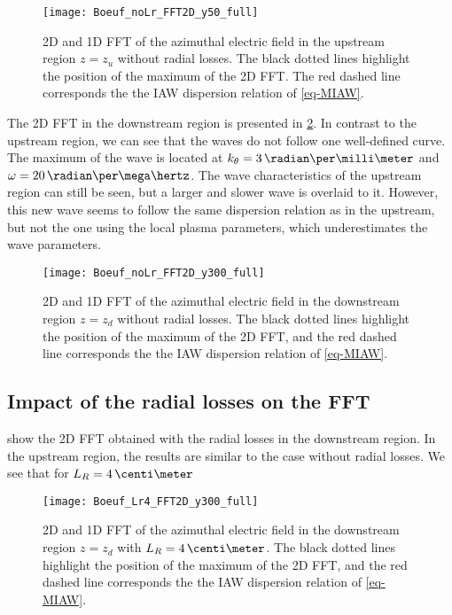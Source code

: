 \begin{figure}[hbtp]
  \centering
  \texttt{[image: Boeuf\_noLr\_FFT2D\_y50\_full]}
  \caption{\ac{2D} and \ac{1D} \ac{FFT} of the azimuthal electric field in the upstream region $z=z_u$ without radial losses. The black dotted lines highlight the position of the maximum of the \ac{2D} \ac{FFT}. The red dashed line corresponds the the \ac{IAW} dispersion relation of \cref{eq-MIAW}.}
  \label{fig-fft2D_noLr_zu}
\end{figure}

The \ac{2D} \ac{FFT} in the downstream region is presented in \cref{fig-fft2D_noLr_zd}.
In contrast to the upstream region, we can see that the waves do not follow one well-defined curve.
The maximum of the wave is located at $k_{\theta} = 3\,\radian\per\milli\meter$ and $\omega = 20\, \radian\per\mega\hertz$.
The wave characteristics of the upstream region can still be seen, but a larger and slower wave is overlaid to it.
However, this new wave seems to follow the same dispersion relation as in the upstream, but not the one using the local plasma parameters, which underestimates the wave parameters.


\begin{figure}[hbtp]
  \centering
  \texttt{[image: Boeuf\_noLr\_FFT2D\_y300\_full]}
  \caption{\ac{2D} and \ac{1D} \ac{FFT} of the azimuthal electric field in the downstream region $z=z_d$ without radial losses.  The black dotted lines highlight the position of the maximum of the \ac{2D} \ac{FFT}, and the red dashed line corresponds the the \ac{IAW} dispersion relation of \cref{eq-MIAW}.}
  \label{fig-fft2D_noLr_zd}
\end{figure}

\subsection{Impact of the radial losses on the \ac{FFT}} \label{subsec-fft_losses}

 show the \ac{2D} \ac{FFT} obtained with the radial losses in the downstream region.
In the upstream region, the results are similar to the case without radial losses.
We see that for $L_R=4\,\centi\meter$

\begin{figure}[hbtp]
  \centering
  \texttt{[image: Boeuf\_Lr4\_FFT2D\_y300\_full]}
  \caption{\ac{2D} and \ac{1D} \ac{FFT} of the azimuthal electric field in the downstream region $z=z_d$ with $L_R=4\,\centi\meter$.  The black dotted lines highlight the position of the maximum of the \ac{2D} \ac{FFT}, and the red dashed line corresponds the the \ac{IAW} dispersion relation of \cref{eq-MIAW}.}
  \label{fig-fft2D_Lr4_zd}
\end{figure}


